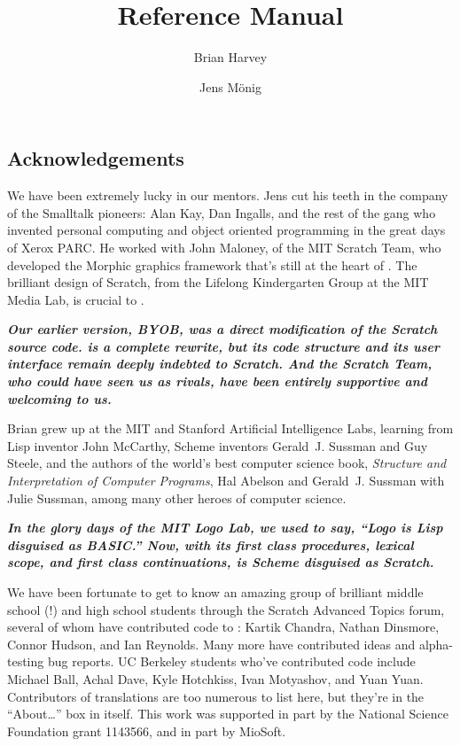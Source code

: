 \documentclass{report}
\begin{document}
\title{\Snap{} Reference Manual}
\author{Brian Harvey \and Jens M\"{o}nig}
\date{}

\maketitle

\tableofcontents

\chapter*{}
\section*{Acknowledgements}

We have been extremely lucky in our mentors. Jens cut his teeth in the company of the Smalltalk pioneers: Alan Kay, Dan Ingalls, and the rest of the gang who invented personal computing and object oriented programming in the great days of Xerox PARC. He worked with John Maloney, of the MIT Scratch Team, who developed the Morphic graphics framework that's still at the heart of \Snap{}. The brilliant design of Scratch, from the Lifelong Kindergarten Group at the MIT Media Lab, is crucial to \Snap{}.

\textbf{\emph{Our earlier version, BYOB, was a direct modification of the Scratch source code. \Snap{} is a complete rewrite, but its code structure and its user interface remain deeply indebted to Scratch. And the Scratch Team, who could have seen us as rivals, have been entirely supportive and welcoming to us.}}

Brian grew up at the MIT and Stanford Artificial Intelligence Labs, learning from Lisp inventor John McCarthy, Scheme inventors Gerald~J. Sussman and Guy Steele, and the authors of the world's best computer science book, \textit{Structure and Interpretation of Computer Programs}, Hal Abelson and Gerald~J. Sussman with Julie Sussman, among many other heroes of computer science.

\textbf{\emph{In the glory days of the MIT Logo Lab, we used to say, ``Logo is Lisp disguised as BASIC.'' Now, with its first class procedures, lexical scope, and first class continuations, \Snap{} is Scheme disguised as Scratch.}}

We have been fortunate to get to know an amazing group of brilliant middle school (!\@) and high school students through the Scratch Advanced Topics forum, several of whom have contributed code to \Snap{}: Kartik Chandra, Nathan Dinsmore, Connor Hudson, and Ian Reynolds. Many more have contributed ideas and alpha-testing bug reports. UC Berkeley students who've contributed code include Michael Ball, Achal Dave, Kyle Hotchkiss, Ivan Motyashov, and Yuan Yuan. Contributors of translations are too numerous to list here, but they're in the ``About\ldots'' box in \Snap{} itself. This work was supported in part by the National Science Foundation grant 1143566, and in part by MioSoft.
\end{document}
